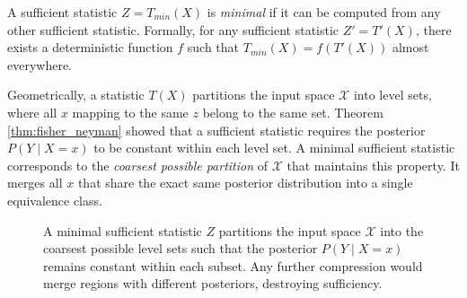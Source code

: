 \begin{definition}
A sufficient statistic $Z = T_{min}(X)$ is \emph{minimal} if it can be computed from any other sufficient statistic. Formally, for any sufficient statistic $Z' = T'(X)$, there exists a deterministic function $f$ such that $T_{min}(X) = f(T'(X))$ almost everywhere.
\end{definition}

Geometrically, a statistic $T(X)$ partitions the input space $\mathcal{X}$ into level sets, where all $x$ mapping to the same $z$ belong to the same set. Theorem \ref{thm:fisher_neyman} showed that a sufficient statistic requires the posterior $P(Y \mid X=x)$ to be constant within each level set. A minimal sufficient statistic corresponds to the \emph{coarsest possible partition} of $\mathcal{X}$ that maintains this property. It merges all $x$ that share the exact same posterior distribution into a single equivalence class.

\begin{figure}[htbp]
\centering
{}
\caption{A minimal sufficient statistic $Z$ partitions the input space $\mathcal{X}$ into the coarsest possible level sets such that the posterior $P(Y \mid X=x)$ remains constant within each subset. Any further compression would merge regions with different posteriors, destroying sufficiency.}
\label{fig:partitions}
\end{figure}

